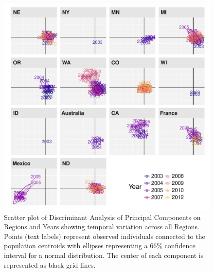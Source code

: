 \begin{figure}
\centering
\includegraphics[width=1.00000\textwidth]{../../results/figures/publication/dapc_region_year.pdf}
\caption{Scatter plot of Discriminant Analysis of Principal Components
on Regions and Years showing temporal variation across all Regions.
Points (text labels) represent observed individuals connected to the
population centroids with ellipses representing a 66\% confidence
interval for a normal distribution. The center of each component is
represented as black grid lines.}\label{DAPC-RY-FULL}
\end{figure}

\newpage

